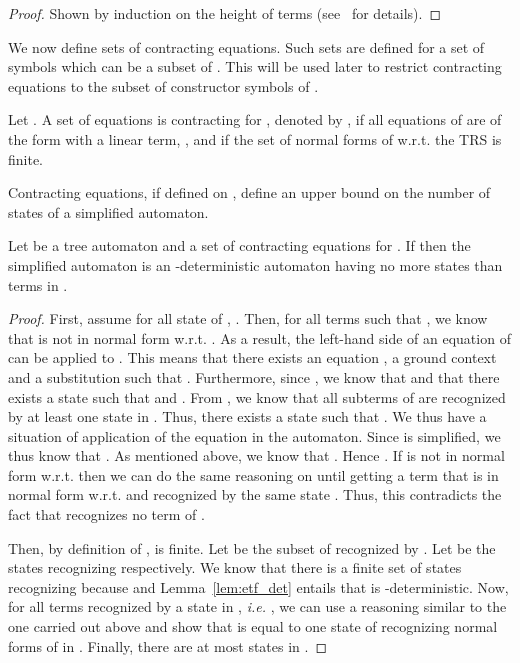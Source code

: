 \documentclass[a4paper,11pt]{llncs}
\theoremstyle{plain}
\begin{document}
\begin{proof} Shown by induction on the height of terms
 (see~\cite{Genet-rep13} for details). 
\end{proof}
\noindent
We now define sets of contracting equations. Such sets are defined for
a set of symbols  which can be a subset of . This will be used later
to restrict contracting equations to the subset of constructor symbols of .

\begin{definition}
Let . A set of equations is contracting for ,
denoted by , if all equations of  are of the form  with  a linear term, , and 
if the set of normal forms of  w.r.t. the TRS  is finite.

\end{definition}

\noindent
Contracting equations, if defined on ,  define an upper bound on the number
of states of a simplified automaton.

\begin{lemma}
\label{lem:cardComp}
Let  be a tree automaton and  a set of contracting equations for
. If  then the simplified automaton 
is an -deterministic automaton having no more states than terms in
.  
\end{lemma}
\begin{proof}
  First, assume for all state  of , . Then, for all terms  such that , we know
  that  is not in normal form w.r.t. . As a result, the left-hand side
  of an equation of  can be applied to . This means that there exists an
  equation , a ground context  and a substitution  such
  that . Furthermore, since , we know
  that  and that there exists a state 
  such that  and . From , we know that all subterms of
   are recognized by at least one state in . Thus, there
  exists a state  such that . We thus
  have a situation of application of the equation  in the
  automaton. Since  is simplified, we thus know that . As
  mentioned above, we know that . Hence
  . If
   is not in normal form w.r.t.  then we can do the same reasoning
  on  until getting a term that is in
  normal form w.r.t.  and recognized by the same state . Thus, this
  contradicts the fact that  recognizes no term of .

Then, by definition of ,  is finite. Let  be the subset of  recognized by . Let  be the states recognizing 
respectively. We know that there is a finite set of states recognizing  because  and Lemma~\ref{lem:etf_det} entails that  is
-deterministic. Now, for all terms  recognized by a state  in , {\em i.e.} ,  we can use a reasoning similar to the
one carried out above and show that  is equal to one state of  recognizing normal forms of  in . Finally, there
are at most  states in . 
\end{proof}
\end{document}
